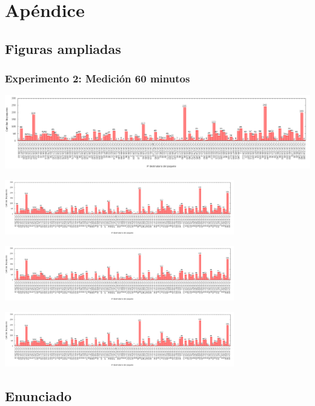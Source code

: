 \section{Apéndice}

\subsection{Figuras ampliadas}
\subsubsection{Experimento 2: Medición 60 minutos} \label{exp2_60_big}
\begin{center}
  \includegraphics[angle=90, height=0.9\textheight]{../mediciones/altop-wifi-60/altop60IpsDstArp.png}
\end{center}

\includegraphics[width=10cm,trim={0 0 35.95cm 0},clip]{../mediciones/altop-wifi-60/altop60IpsDstArp.png}

\includegraphics[width=10cm,trim={17cm 0 20.7cm 0},clip]{../mediciones/altop-wifi-60/altop60IpsDstArp.png}

\includegraphics[width=10cm,trim={32.26cm 0 0 0},clip]{../mediciones/altop-wifi-60/altop60IpsDstArp.png}

\subsection{Enunciado}




